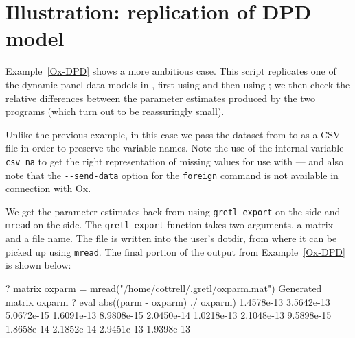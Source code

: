 \section{Illustration: replication of DPD model}
\label{sec:dpd-replication}

Example~\ref{Ox-DPD} shows a more ambitious case.  This script
replicates one of the dynamic panel data models in
\cite{arellano-bond91}, first using  and then using
; we then check the relative differences between the parameter
estimates produced by the two programs (which turn out to be
reassuringly small).

Unlike the previous example, in this case we pass the dataset from
 to  as a CSV file in order to preserve the
variable names.  Note the use of the internal variable \verb|csv_na|
to get the right representation of missing values for use with
 --- and also note that the \verb|--send-data| option for the
\texttt{foreign} command is not available in connection with Ox.

We get the parameter estimates back from  using
\verb|gretl_export| on the  side and \texttt{mread} on the
 side.  The \verb|gretl_export| function takes two
arguments, a matrix and a file name.  The file is written into the
user's dotdir, from where it can be picked up using \texttt{mread}.
The final portion of the output from Example~\ref{Ox-DPD} is shown
below:
%
\begin{code}
? matrix oxparm = mread("/home/cottrell/.gretl/oxparm.mat")
Generated matrix oxparm
? eval abs((parm - oxparm) ./ oxparm)
  1.4578e-13 
  3.5642e-13 
  5.0672e-15 
  1.6091e-13 
  8.9808e-15 
  2.0450e-14 
  1.0218e-13 
  2.1048e-13 
  9.5898e-15 
  1.8658e-14 
  2.1852e-14 
  2.9451e-13 
  1.9398e-13 
\end{code}

